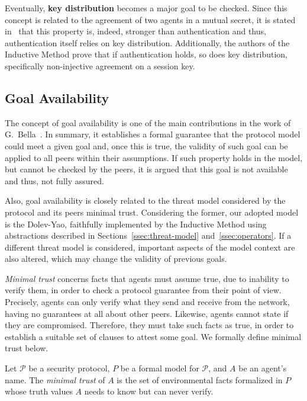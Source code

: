 Eventually, \textbf{key distribution} becomes a major goal to be checked. Since this concept is related to the agreement of two agents in a mutual secret, it is stated in~\cite{BellareRogaway93} that this property is, indeed, stronger than authentication and thus, authentication itself relies on key distribution. Additionally, the authors of the Inductive Method prove that if authentication holds, so does key distribution, specifically non-injective agreement on a session key.



\subsection{Goal Availability}
The concept of goal availability is one of the main contributions in the work of G.~Bella~\cite{Bella2007}. In summary, it establishes a formal guarantee that the protocol model could meet a given goal and, once this is true, the validity of such goal can be applied to all peers within their assumptions. If such property holds in the model, but cannot be checked by the peers, it is argued that this goal is not available and thus, not fully assured.

Also, goal availability is closely related to the threat model considered by the protocol and its peers minimal trust. Considering the former, our adopted model is the Dolev-Yao, faithfully implemented by the Inductive Method using abstractions described in Sections~\ref{ssec:threat-model} and~\ref{ssec:operators}. If a different threat model is considered, important aspects of the model context are also altered, which may change the validity of previous goals.

\textit{Minimal trust} concerns facts that agents must assume true, due to inability to verify them, in order to check a protocol guarantee from their point of view. Precisely, agents can only verify what they send and receive from the network, having no guarantees at all about other peers. Likewise, agents cannot state if they are compromised. Therefore, they must take such facts as true, in order to establish a suitable set of clauses to attest some goal. We formally define minimal trust below.

\begin{definition}
  Let \(\mathcal{P}\) be a security protocol, \(P\) be a formal model for \(\mathcal{P}\), and \(A\) be an agent's name. The \textit{minimal trust} of \(A\) is the set of environmental facts formalized in \(P\) whose truth values \(A\) needs to know but can never verify.
\end{definition}

